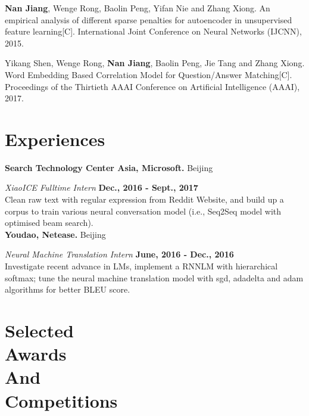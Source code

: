\documentclass[margin,line]{resume}
\begin{document}
\begin{resume}

\textbf{Nan Jiang}, Wenge Rong, Baolin Peng, Yifan Nie and Zhang Xiong. An empirical analysis of different sparse penalties for autoencoder in unsupervised feature learning[C]. International Joint Conference on Neural Networks (IJCNN), 2015.

Yikang Shen, Wenge Rong, \textbf{Nan Jiang}, Baolin Peng, Jie Tang and Zhang Xiong. Word Embedding Based Correlation Model for Question/Answer Matching[C]. Proceedings of the Thirtieth {AAAI} Conference on Artificial Intelligence (AAAI), 2017.


\section{Experiences}
{\bf Search Technology Center Asia, Microsoft.} Beijing

{\em XiaoICE Fulltime Intern} \hfill {\bf Dec., 2016 - Sept., 2017}\\
Clean raw text with regular expression from Reddit Website, and build up a corpus to train various neural conversation model (i.e., Seq2Seq model with optimised beam search).\\


{\bf Youdao, Netease.} Beijing

{\em Neural Machine Translation Intern} \hfill {\bf June, 2016 - Dec., 2016}\\
Investigate recent advance in LMs, implement a RNNLM with hierarchical softmax; tune the neural machine translation model with sgd, adadelta and adam algorithms for better BLEU score.


%






\section{Selected \\ Awards \\And\\Competitions}



\end{resume}
\end{document}
